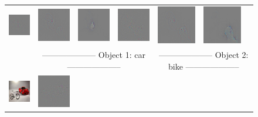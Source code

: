 \begin{figure}
\begin{center}
\begin{tabular}{ccccccc}
\includegraphics[width=0.14\linewidth,height=0.115\linewidth]{figs/examples/googlenet/oxford/dog-cat4_diff_243} &
\includegraphics[width=0.14\linewidth,height=0.115\linewidth]{figs/examples/googlenet/deconv/dog-cat4_diff_243} &
\includegraphics[width=0.14\linewidth,height=0.115\linewidth]{figs/examples/googlenet/soft/dog-cat4_diff_243} &
\includegraphics[width=0.14\linewidth,height=0.115\linewidth]{figs/examples/googlenet/oxford/dog-cat4_diff_286} &
\includegraphics[width=0.14\linewidth,height=0.115\linewidth]{figs/examples/googlenet/deconv/dog-cat4_diff_286} &
\includegraphics[width=0.14\linewidth,height=0.115\linewidth]{figs/examples/googlenet/soft/dog-cat4_diff_286} \\
& \multicolumn{3}{c}{\small -------------------- Object 1: car --------------------} & \multicolumn{3}{c}{\small -------------------- Object 2: bike --------------------} \\
\vspace{-2.5pt}
\includegraphics[width=0.14\linewidth,height=0.115\linewidth]{figs/examples/googlenet/oxford/bic-car1} &
\includegraphics[width=0.14\linewidth,height=0.115\linewidth]{figs/examples/googlenet/oxford/bic-car1_diff_818} &

\end{tabular}
\end{center}
\end{figure}
